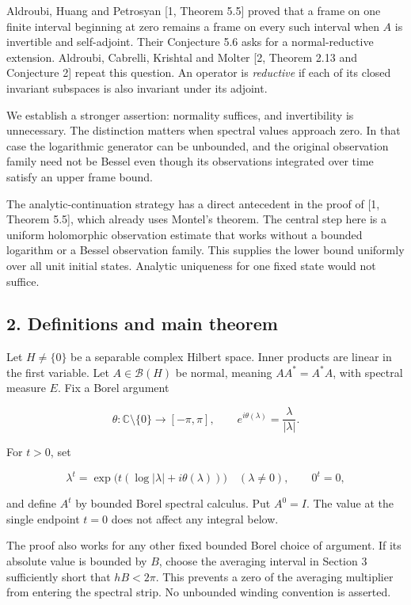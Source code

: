 \documentclass[
  11pt,
]{article}
\begin{document}
Aldroubi, Huang and Petrosyan {[}1, Theorem 5.5{]} proved that a frame
on one finite interval beginning at zero remains a frame on every such
interval when \(A\) is invertible and self-adjoint. Their Conjecture 5.6
asks for a normal-reductive extension. Aldroubi, Cabrelli, Krishtal and
Molter {[}2, Theorem 2.13 and Conjecture 2{]} repeat this question. An
operator is \emph{reductive} if each of its closed invariant subspaces
is also invariant under its adjoint.

We establish a stronger assertion: normality suffices, and invertibility
is unnecessary. The distinction matters when spectral values approach
zero. In that case the logarithmic generator can be unbounded, and the
original observation family need not be Bessel even though its
observations integrated over time satisfy an upper frame bound.

The analytic-continuation strategy has a direct antecedent in the proof
of {[}1, Theorem 5.5{]}, which already uses Montel's theorem. The
central step here is a uniform holomorphic observation estimate that
works without a bounded logarithm or a Bessel observation family. This
supplies the lower bound uniformly over all unit initial states.
Analytic uniqueness for one fixed state would not suffice.

\subsection{2. Definitions and main
theorem}\label{definitions-and-main-theorem}

Let \(H\neq\{0\}\) be a separable complex Hilbert space. Inner products
are linear in the first variable. Let \(A\in\mathcal B(H)\) be normal,
meaning \(AA^*=A^*A\), with spectral measure \(E\). Fix a Borel argument

\[
\theta:\mathbb C\setminus\{0\}\longrightarrow[-\pi,\pi],
\qquad e^{i\theta(\lambda)}=\frac{\lambda}{|\lambda|}.
\]

For \(t>0\), set

\[
\lambda^t=\exp\!\bigl(t(\log|\lambda|+i\theta(\lambda))\bigr)
\quad(\lambda\neq0),\qquad 0^t=0,
\]

and define \(A^t\) by bounded Borel spectral calculus. Put \(A^0=I\).
The value at the single endpoint \(t=0\) does not affect any integral
below.

The proof also works for any other fixed bounded Borel choice of
argument. If its absolute value is bounded by \(B\), choose the
averaging interval in Section 3 sufficiently short that \(hB<2\pi\).
This prevents a zero of the averaging multiplier from entering the
spectral strip. No unbounded winding convention is asserted.
\end{document}
